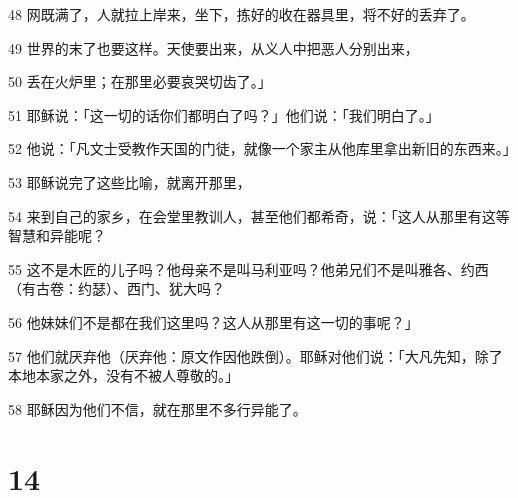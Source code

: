 \par 48 网既满了，人就拉上岸来，坐下，拣好的收在器具里，将不好的丢弃了。
\par 49 世界的末了也要这样。天使要出来，从义人中把恶人分别出来，
\par 50 丢在火炉里；在那里必要哀哭切齿了。」
\par 51 耶稣说：「这一切的话你们都明白了吗？」他们说：「我们明白了。」
\par 52 他说：「凡文士受教作天国的门徒，就像一个家主从他库里拿出新旧的东西来。」
\par 53 耶稣说完了这些比喻，就离开那里，
\par 54 来到自己的家乡，在会堂里教训人，甚至他们都希奇，说：「这人从那里有这等智慧和异能呢？
\par 55 这不是木匠的儿子吗？他母亲不是叫马利亚吗？他弟兄们不是叫雅各、约西（有古卷：约瑟）、西门、犹大吗？
\par 56 他妹妹们不是都在我们这里吗？这人从那里有这一切的事呢？」
\par 57 他们就厌弃他（厌弃他：原文作因他跌倒）。耶稣对他们说：「大凡先知，除了本地本家之外，没有不被人尊敬的。」
\par 58 耶稣因为他们不信，就在那里不多行异能了。

\chapter{14}

